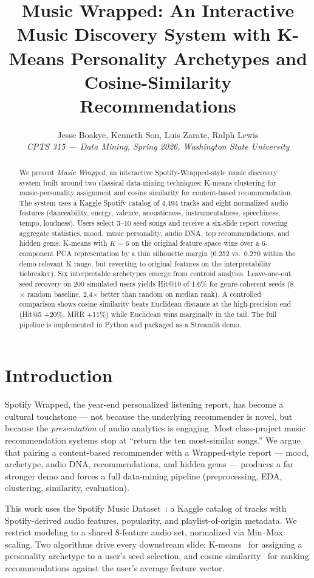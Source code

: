 \documentclass[letterpaper, 10 pt, conference]{ieeeconf}
\title{Music Wrapped: An Interactive Music Discovery System with K-Means Personality Archetypes and Cosine-Similarity Recommendations}
\author{Jesse Boakye, Kenneth Son, Luis Zarate, Ralph Lewis \\
\textit{CPTS 315 --- Data Mining, Spring 2026, Washington State University}}
\begin{document}
\maketitle

\begin{abstract}
We present \emph{Music Wrapped}, an interactive Spotify-Wrapped-style music discovery system built around two classical data-mining techniques: K-means clustering for music-personality assignment and cosine similarity for content-based recommendation. The system uses a Kaggle Spotify catalog of 4{,}494 tracks and eight normalized audio features (danceability, energy, valence, acousticness, instrumentalness, speechiness, tempo, loudness). Users select 3--10 seed songs and receive a six-slide report covering aggregate statistics, mood, music personality, audio DNA, top recommendations, and hidden gems. K-means with $K{=}6$ on the original feature space wins over a 6-component PCA representation by a thin silhouette margin (0.252 vs.\ 0.270 within the demo-relevant K range, but reverting to original features on the interpretability tiebreaker). Six interpretable archetypes emerge from centroid analysis. Leave-one-out seed recovery on 200 simulated users yields Hit@10 of 1.6\% for genre-coherent seeds (8$\times$ random baseline, 2.4$\times$ better than random on median rank). A controlled comparison shows cosine similarity beats Euclidean distance at the high-precision end (Hit@5 +20\%, MRR +11\%) while Euclidean wins marginally in the tail. The full pipeline is implemented in Python and packaged as a Streamlit demo.
\end{abstract}

\section{Introduction}

Spotify Wrapped, the year-end personalized listening report, has become a cultural touchstone --- not because the underlying recommender is novel, but because the \emph{presentation} of audio analytics is engaging. Most class-project music recommendation systems stop at ``return the ten most-similar songs.'' We argue that pairing a content-based recommender with a Wrapped-style report --- mood, archetype, audio DNA, recommendations, and hidden gems --- produces a far stronger demo and forces a full data-mining pipeline (preprocessing, EDA, clustering, similarity, evaluation).

This work uses the Spotify Music Dataset~\cite{spotify_dataset}: a Kaggle catalog of tracks with Spotify-derived audio features, popularity, and playlist-of-origin metadata. We restrict modeling to a shared 8-feature audio set, normalized via Min--Max scaling. Two algorithms drive every downstream slide: K-means~\cite{macqueen1967kmeans} for assigning a personality archetype to a user's seed selection, and cosine similarity~\cite{singhal2001modern} for ranking recommendations against the user's average feature vector.
\end{document}
